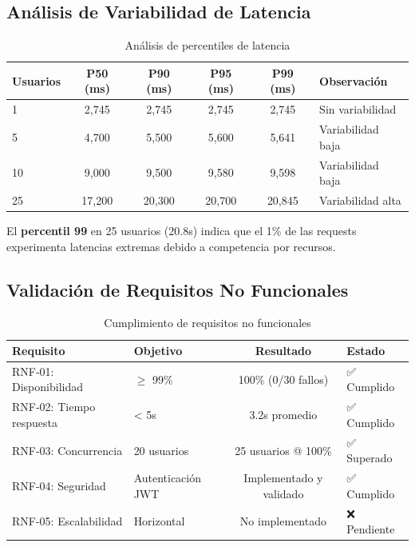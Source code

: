 \documentclass[12pt,a4paper]{report}
\begin{document}
\subsection{Análisis de Variabilidad de Latencia}

\begin{table}[H]
\centering
\caption{Análisis de percentiles de latencia}
\label{tab:percentiles}
\begin{tabular}{lccccp{4cm}}
\toprule
\textbf{Usuarios} & \textbf{P50 (ms)} & \textbf{P90 (ms)} & \textbf{P95 (ms)} & \textbf{P99 (ms)} & \textbf{Observación} \\
\midrule
1 & 2,745 & 2,745 & 2,745 & 2,745 & Sin variabilidad \\
5 & 4,700 & 5,500 & 5,600 & 5,641 & Variabilidad baja \\
10 & 9,000 & 9,500 & 9,580 & 9,598 & Variabilidad baja \\
25 & 17,200 & 20,300 & 20,700 & 20,845 & Variabilidad alta \\
\bottomrule
\end{tabular}
\end{table}

El \textbf{percentil 99} en 25 usuarios (20.8s) indica que el 1\% de las requests experimenta latencias extremas debido a competencia por recursos.

\subsection{Validación de Requisitos No Funcionales}

\begin{table}[H]
\centering
\caption{Cumplimiento de requisitos no funcionales}
\label{tab:rnf}
\begin{tabular}{llcl}
\toprule
\textbf{Requisito} & \textbf{Objetivo} & \textbf{Resultado} & \textbf{Estado} \\
\midrule
RNF-01: Disponibilidad & $\geq$ 99\% & 100\% (0/30 fallos) & ✅ Cumplido \\
RNF-02: Tiempo respuesta & < 5s & 3.2s promedio & ✅ Cumplido \\
RNF-03: Concurrencia & 20 usuarios & 25 usuarios @ 100\% & ✅ Superado \\
RNF-04: Seguridad & Autenticación JWT & Implementado y validado & ✅ Cumplido \\
RNF-05: Escalabilidad & Horizontal & No implementado & ❌ Pendiente \\
\bottomrule
\end{tabular}
\end{table}
\end{document}
